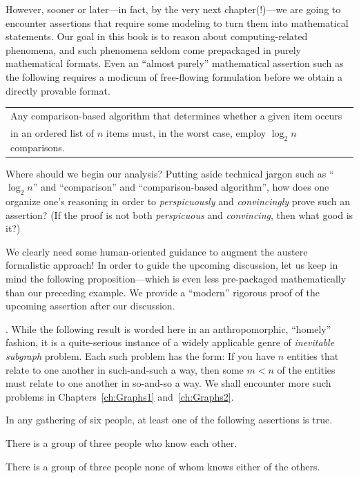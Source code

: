 \smallskip

However, sooner or later---in fact, by the very next chapter(!)---we are going to encounter assertions that require some modeling to turn them into mathematical statements.  Our goal in this book is to reason about computing-related phenomena, and such phenomena seldom come prepackaged in purely mathematical formats.  Even an ``almost purely'' mathematical assertion such as the following requires a modicum of free-flowing formulation before we obtain a directly provable format.

\medskip

{\em
\begin{tabular}{l}
Any comparison-based algorithm that determines whether a given item occurs \\
in an ordered list of $n$ items must, in the worst case, employ $\log_2 n$ comparisons.
\end{tabular}
}

\medskip

\noindent
Where should we begin our analysis?  Putting aside technical jargon such as ``$\log_2 n$'' and ``comparison'' and ``comparison-based algorithm'', how does one organize one's reasoning in order to {\em perspicuously} and {\em convincingly} prove such an assertion?  (If the proof is not both  {\em perspicuous} and {\em convincing}, then what good is it?)

\smallskip

We clearly need some human-oriented guidance to augment the austere formalistic approach!  In order to guide the upcoming discussion, let us keep in mind the following proposition---which is even less pre-packaged mathematically than our preceding example.  We provide a ``modern'' rigorous proof of the upcoming assertion after our discussion.

\medskip

.
While the following result is worded here in an anthropomorphic, ``homely'' fashion, it is a quite-serious instance of a widely applicable genre of {\it inevitable subgraph} problem.  Each such problem has the form: If you have $n$ entities that relate to one another in such-and-such a
way, then some $m < n$ of the entities must relate to one another in so-and-so a way.  We shall encounter more such problems in Chapters~\ref{ch:Graphs1} and~\ref{ch:Graphs2}.

\begin{prop}
\label{thm:triangle-cotriangles}
In any gathering of six people, at least one of the following assertions is true.

There is a group of three people who know each other.

There is a group of three people none of whom knows either of the others.
\end{prop}

